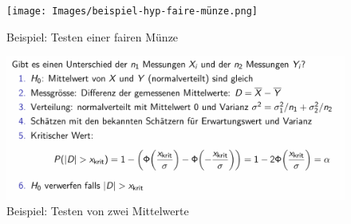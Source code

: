 \documentclass[../Main.tex]{subfiles}
\begin{document}
\begin{figure}[H]
    \centering
    \texttt{[image: Images/beispiel-hyp-faire-münze.png]}
    \caption{Beispiel: Testen einer fairen Münze}
\end{figure}

\begin{figure}[H]
    \centering
    \includegraphics[width=1\linewidth]{Images/beispiel-hyp-mittelwert.png}
    \caption{Beispiel: Testen von zwei Mittelwerte}
\end{figure}
\end{document}

